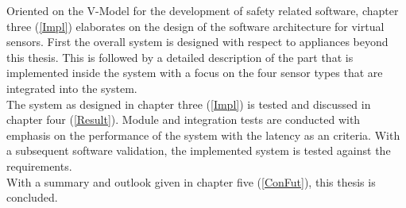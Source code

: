  Oriented on the V-Model for the development of safety related software, chapter three (\ref{Impl}) elaborates on the design of the software architecture for virtual sensors. First the overall system is designed with respect to appliances beyond this thesis. This is followed by a detailed description of the part that is implemented inside the system with a focus on the four sensor types that are integrated into the system. \\ 
 
 The system as designed in chapter three (\ref{Impl}) is tested and discussed in chapter four (\ref{Result}). Module and integration tests are conducted with emphasis on the performance of the system with the latency as an criteria. With a subsequent software validation, the implemented system is tested against the requirements.\\
 
 With a summary and outlook given in chapter five (\ref{ConFut}), this thesis is concluded.
 